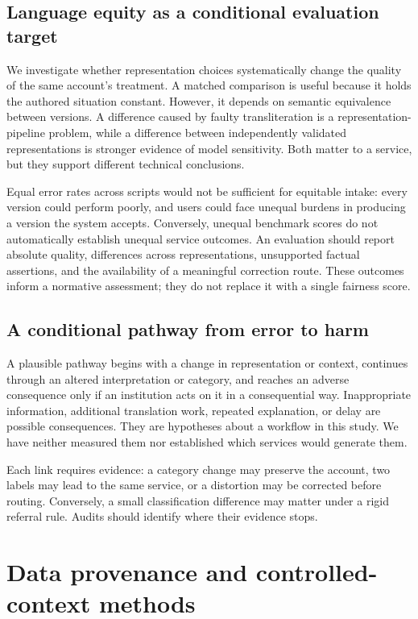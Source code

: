 \documentclass[manuscript,screen,review,anonymous]{acmart}
\begin{document}
\subsection{Language equity as a conditional evaluation target}

We investigate whether representation choices systematically change the quality of the same account's treatment. A matched comparison is useful because it holds the authored situation constant. However, it depends on semantic equivalence between versions. A difference caused by faulty transliteration is a representation-pipeline problem, while a difference between independently validated representations is stronger evidence of model sensitivity. Both matter to a service, but they support different technical conclusions.

Equal error rates across scripts would not be sufficient for equitable intake: every version could perform poorly, and users could face unequal burdens in producing a version the system accepts. Conversely, unequal benchmark scores do not automatically establish unequal service outcomes. An evaluation should report absolute quality, differences across representations, unsupported factual assertions, and the availability of a meaningful correction route. These outcomes inform a normative assessment; they do not replace it with a single fairness score.

\subsection{A conditional pathway from error to harm}

A plausible pathway begins with a change in representation or context, continues through an altered interpretation or category, and reaches an adverse consequence only if an institution acts on it in a consequential way. Inappropriate information, additional translation work, repeated explanation, or delay are possible consequences. They are hypotheses about a workflow in this study. We have neither measured them nor established which services would generate them.

Each link requires evidence: a category change may preserve the account, two labels may lead to the same service, or a distortion may be corrected before routing. Conversely, a small classification difference may matter under a rigid referral rule. Audits should identify where their evidence stops.

\section{Data provenance and controlled-context methods}
\end{document}
